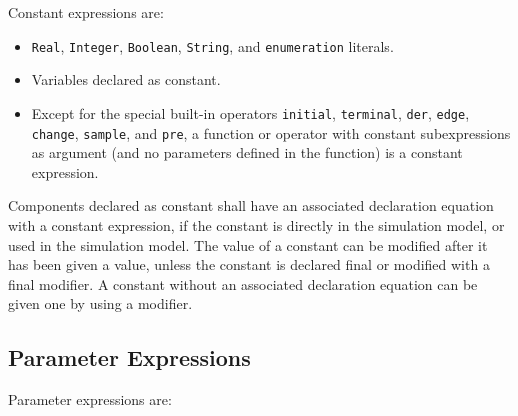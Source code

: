 Constant expressions are:

\begin{itemize}
\item
  \lstinline[basicstyle=\ttfamily]!Real!, \lstinline[basicstyle=\ttfamily]!Integer!, \lstinline[basicstyle=\ttfamily]!Boolean!, \lstinline[basicstyle=\ttfamily]!String!, and \lstinline[basicstyle=\ttfamily]!enumeration! literals.
\item
  Variables declared as constant.
\item
  Except for the special built-in operators \lstinline[basicstyle=\ttfamily]!initial!, \lstinline[basicstyle=\ttfamily]!terminal!, \lstinline[basicstyle=\ttfamily]!der!,
  \lstinline[basicstyle=\ttfamily]!edge!, \lstinline[basicstyle=\ttfamily]!change!, \lstinline[basicstyle=\ttfamily]!sample!, and \lstinline[basicstyle=\ttfamily]!pre!, a function or operator with constant
  subexpressions as argument (and no parameters defined in the function)
  is a constant expression.
\end{itemize}

Components declared as constant shall have an associated declaration
equation with a constant expression, if the constant is directly in the
simulation model, or used in the simulation model. The value of a
constant can be modified after it has been given a value, unless the
constant is declared final or modified with a final modifier. A constant
without an associated declaration equation can be given one by using a
modifier.

\subsection{Parameter Expressions}

Parameter expressions are:

